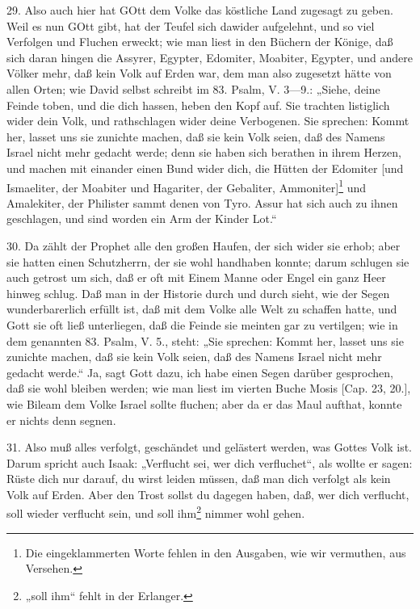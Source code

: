 29. Also auch hier hat GOtt dem Volke das köstliche Land zugesagt zu geben. Weil es nun GOtt gibt, hat der Teufel sich dawider aufgelehnt, und so viel Verfolgen und Fluchen erweckt; wie man liest in den Büchern der Könige, daß sich daran hingen die Assyrer, Egypter, Edomiter, Moabiter, Egypter, und andere Völker mehr, daß kein Volk auf Erden war, dem man
also zugesetzt hätte von allen Orten; wie David selbst schreibt im 83. Psalm, V. 3—9.: „Siehe, deine Feinde toben, und die dich hassen, heben den Kopf auf. Sie trachten listiglich wider dein Volk, und rathschlagen wider deine Verbogenen. Sie sprechen: Kommt her, lasset uns sie zunichte machen, daß sie kein Volk seien, daß des Namens Israel nicht mehr gedacht werde; denn sie haben sich berathen in ihrem Herzen, und machen mit einander einen Bund wider dich, die Hütten der Edomiter [und Ismaeliter, der Moabiter und Hagariter, der Gebaliter, Ammoniter]\footnote{Die eingeklammerten Worte fehlen in den Ausgaben, wie wir vermuthen, aus Versehen.} und Amalekiter, der Philister sammt denen von Tyro. Assur hat sich auch zu ihnen geschlagen, und sind worden ein Arm der Kinder Lot.“

30. Da zählt der Prophet alle den großen Haufen, der sich wider sie erhob; aber sie hatten einen Schutzherrn, der sie wohl handhaben konnte; darum schlugen sie auch getrost um sich, daß er oft mit Einem Manne oder Engel ein ganz Heer hinweg schlug. Daß man in der Historie durch und durch sieht, wie der Segen wunderbarerlich erfüllt ist, daß mit dem Volke alle Welt zu schaffen hatte, und Gott sie oft ließ unterliegen, daß die Feinde sie meinten gar zu vertilgen; wie in dem genannten 83. Psalm, V. 5., steht: „Sie sprechen: Kommt her, lasset uns sie zunichte machen, daß sie kein Volk seien, daß des Namens Israel nicht mehr gedacht werde.“ Ja, sagt Gott dazu, ich habe einen Segen darüber gesprochen, daß sie wohl bleiben werden; wie man liest im vierten Buche Mosis [Cap. 23, 20.], wie Bileam dem Volke Israel sollte fluchen; aber da er das Maul aufthat, konnte er nichts denn segnen.

31. Also muß alles verfolgt, geschändet und gelästert werden, was Gottes Volk ist. Darum spricht auch Isaak: „Verflucht sei, wer dich verfluchet“, als wollte er sagen: Rüste dich nur darauf, du wirst leiden müssen, daß man dich verfolgt als kein Volk auf Erden. Aber den Trost sollst du dagegen haben, daß, wer dich verflucht, soll wieder verflucht sein, und soll ihm\footnote{„soll ihm“ fehlt in der Erlanger.} nimmer wohl gehen.

